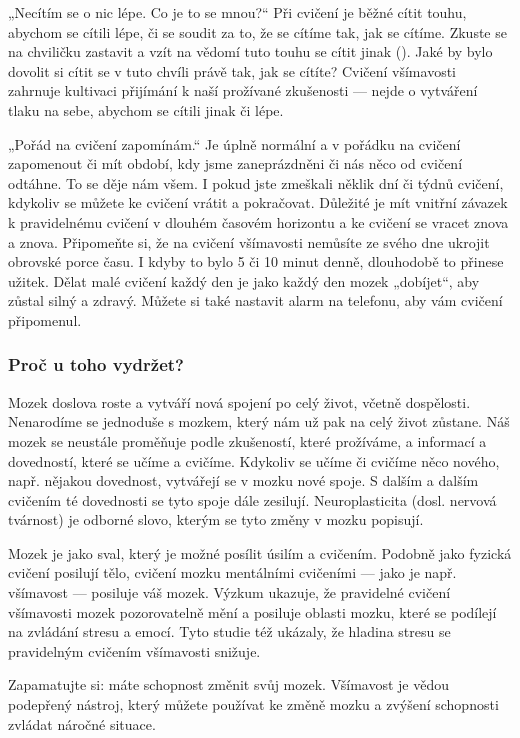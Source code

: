 \begin{description*}
		\item[„Necítím se o nic lépe. Co je to se mnou?“] Při cvičení je běžné cítit touhu, abychom se cítili lépe, či se soudit za to, že se cítíme tak, jak se cítíme. Zkuste se na chviličku zastavit a vzít na vědomí tuto touhu se cítit jinak (). Jaké by bylo dovolit si cítit se v tuto chvíli právě tak, jak se cítíte? Cvičení všímavosti zahrnuje kultivaci přijímání k naší prožívané zkušenosti — nejde o vytváření tlaku na sebe, abychom se cítili jinak či lépe.
		\item[„Pořád na cvičení zapomínám.“] Je úplně normální a v pořádku na cvičení zapomenout či mít období, kdy jsme zaneprázdněni či nás něco od cvičení odtáhne. To se děje nám všem. I pokud jste zmeškali něklik dní či týdnů cvičení, kdykoliv se můžete ke cvičení vrátit a pokračovat. Důležité je mít vnitřní závazek k pravidelnému cvičení v dlouhém časovém horizontu a ke cvičení se vracet znova a znova. Připomeňte si, že na cvičení všímavosti nemůsíte ze svého dne ukrojit obrovské porce času. I kdyby to bylo 5 či 10 minut denně, dlouhodobě to přinese užitek. Dělat malé cvičení každý den je jako každý den mozek „dobíjet“, aby zůstal silný a zdravý. Můžete si také nastavit alarm na telefonu, aby vám cvičení připomenul.
	\end{description*}

\subsubsection*{Proč u toho vydržet?}
	\begin{description*}
		\item[Mozek doslova roste a vytváří nová spojení po celý život,] včetně dospělosti. Nenarodíme se jednoduše s mozkem, který nám už pak na celý život zůstane. Náš mozek se neustále proměňuje podle zkušeností, které prožíváme, a informací a dovedností, které se učíme a cvičíme. Kdykoliv se učíme či cvičíme něco nového, např. nějakou dovednost, vytvářejí se v mozku nové spoje. S dalším a dalším cvičením té dovednosti se tyto spoje dále zesilují. Neuroplasticita (dosl. nervová tvárnost) je odborné slovo, kterým se tyto změny v mozku popisují.
		\item[Mozek je jako sval, který je možné posílit úsilím a cvičením.] Podobně jako fyzická cvičení posilují tělo, cvičení mozku mentálními cvičeními — jako je např. všímavost — posiluje váš mozek. Výzkum ukazuje, že pravidelné cvičení všímavosti mozek pozorovatelně mění a posiluje oblasti mozku, které se podílejí na zvládání stresu a emocí. Tyto studie též ukázaly, že hladina stresu se pravidelným cvičením všímavosti snižuje.
		\item[Zapamatujte si:] máte schopnost změnit svůj mozek. Všímavost je vědou podepřený nástroj, který můžete používat ke změně mozku a zvýšení schopnosti zvládat náročné situace.
	\end{description*}


